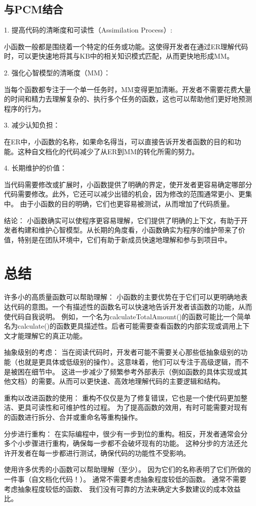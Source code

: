 \subsection{与PCM结合}
1. 提高代码的清晰度和可读性（Assimilation Process）:

小函数一般都是围绕着一个特定的任务或功能。这使得开发者在通过ER理解代码时，可以更快速地将其与KB中的相关知识模式匹配，从而更快地形成MM。

2. 强化心智模型的清晰度（MM）：

当每个函数都专注于一个单一任务时，MM变得更加清晰。开发者不需要花费大量的时间和精力去理解复杂的、执行多个任务的函数，这也可以帮助他们更好地预测程序的行为。

3. 减少认知负担：

在ER中，小函数的名称，如果命名得当，可以直接告诉开发者函数的目的和功能。这种自文档化的代码减少了从ER到MM的转化所需的努力。

4. 长期维护的价值：

当代码需要修改或扩展时，小函数提供了明确的界定，使开发者更容易确定哪部分代码需要修改。此外，它还可以减少出错的机会，因为修改的范围通常更小、更集中。
由于小函数的目的明确，它们也更容易被测试，从而增加了代码质量。

结论：
小函数确实可以使程序更容易理解，它们提供了明确的上下文，有助于开发者构建和维护心智模型。从长期的角度看，小函数确实为程序的维护带来了价值，特别是在团队环境中，它们有助于新成员快速地理解和参与到项目中。

\section{总结}
许多小的高质量函数可以帮助理解：
小函数的主要优势在于它们可以更明确地表达代码的意图。一个有描述性的函数名可以快速地告诉开发者该函数的功能，从而使代码自我说明。
例如，一个名为calculateTotalAmount()的函数可能比一个简单名为calculate()的函数更具描述性。后者可能需要查看函数的内部实现或调用上下文才能理解它的真正功能。

抽象级别的考虑：
当在阅读代码时，开发者可能不需要关心那些低抽象级别的功能（也就是更具体或低级别的操作）。这意味着，他们可以专注于高级逻辑，而不是被困在细节中。
这进一步减少了频繁参考外部表示（例如函数的具体实现或其他文档）的需要。从而可以更快速、高效地理解代码的主要逻辑和结构。

重构以改进函数的使用：
重构不仅仅是为了修复错误，它也是一个使代码更加整洁、更具可读性和可维护性的过程。
为了提高函数的效用，有时可能需要对现有的函数进行拆分、合并或重命名等重构操作。

分步进行重构：
在实际编程中，很少有一步到位的重构。相反，开发者通常会分多个小步骤进行重构，确保每一步都不会破坏现有的功能。
这种分步的方法还允许开发者在每一步都进行测试，确保代码的功能性不受影响。

使用许多优秀的小函数可以帮助理解（至少）。
因为它们的名称表明了它们所做的一件事（自文档化代码！）。
通常不需要考虑抽象程度较低的函数。
通常不需要考虑抽象程度较低的函数、
我们没有可靠的方法来确定大多数建议的成本效益比。